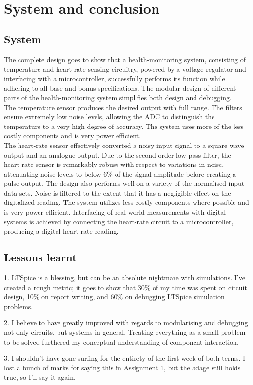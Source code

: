 \chapter{System and conclusion}

\section{System}
The complete design goes to show that a health-monitoring system, consisting of temperature and heart-rate sensing circuitry, powered by a voltage regulator and interfacing with a microcontroller, successfully performs its function while adhering to all base and bonus specifications. The modular design of different parts of the health-monitoring system simplifies both design and debugging.    \\

The temperature sensor produces the desired output with full range. The filters ensure extremely low noise levels, allowing the ADC to distinguish the temperature to a very high degree of accuracy. The system uses more of the less costly components and is very power efficient.\\

The heart-rate sensor effectively converted a noisy input signal to a square wave output and an analogue output. Due to the second order low-pass filter, the heart-rate sensor is remarkably robust with respect to variations in noise, attenuating noise levels to below 6\% of the signal amplitude before creating a pulse output. The design also performs well on a variety of the normalised input data sets. Noise is filtered to the extent that it has a negligible effect on the digitalized reading. The system utilizes less costly components where possible and is very power efficient. Interfacing of real-world measurements with digital systems is achieved by connecting the heart-rate circuit to a microcontroller, producing a digital heart-rate reading.

\section{Lessons learnt}
1. LTSpice is a blessing, but can be an absolute nightmare with simulations. I've created a rough metric; it goes to show that 30\% of my time was spent on circuit design, 10\% on report writing, and 60\% on debugging LTSpice simulation problems.

2. I believe to have greatly improved with regards to modularising and debugging not only circuits, but systems in general. Treating everything as a small problem to be solved furthered my conceptual understanding of component interaction.

3. I shouldn't have gone surfing for the entirety of the first week of both terms. I lost a bunch of marks for saying this in Assignment 1, but the adage still holds true, so I'll say it again.